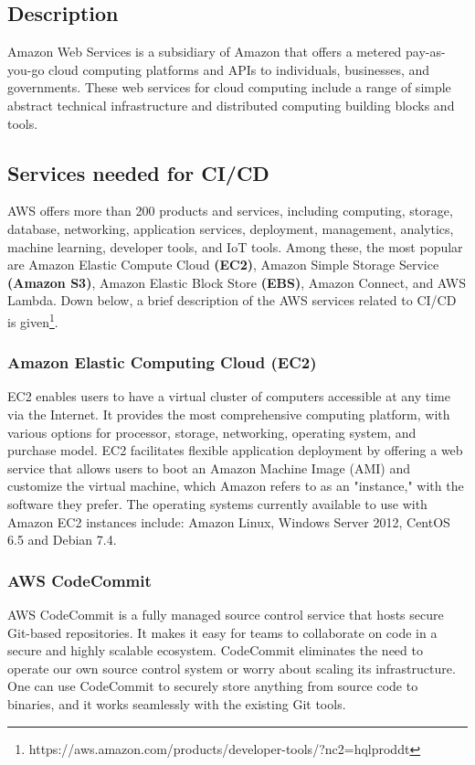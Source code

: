 \subsection{Description}
%
Amazon Web Services is a subsidiary of Amazon that offers a metered pay-as-you-go cloud computing platforms and APIs to individuals, businesses, and governments. These web services for cloud computing include a range of simple abstract technical infrastructure and distributed computing building blocks and tools. 
%
\subsection{Services needed for CI/CD}
%
AWS offers more than 200 products and services, including computing, storage, database, networking, application services, deployment, management, analytics, machine learning, developer tools, and IoT tools. Among these, the most popular are Amazon Elastic Compute Cloud \textbf{(EC2)}, Amazon Simple Storage Service \textbf{(Amazon S3)}, Amazon Elastic Block Store \textbf{(EBS)}, Amazon Connect, and AWS Lambda. Down below, a brief description of the AWS services related to CI/CD is given\footnote{https://aws.amazon.com/products/developer-tools/?nc2=h\textunderscore ql\textunderscore prod\textunderscore dt}. 

\subsubsection{Amazon Elastic Computing Cloud (EC2)}
%
EC2 enables users to have a virtual cluster of computers accessible at any time via the Internet. It provides the most comprehensive computing platform, with  various options for processor, storage, networking, operating system, and purchase model. EC2 facilitates flexible application deployment by offering a web service that allows users to boot an Amazon Machine Image (AMI) and customize the virtual machine, which Amazon refers to as an "instance," with the software they prefer. The operating systems currently available to use with Amazon EC2 instances include: Amazon Linux, Windows Server 2012, CentOS 6.5 and Debian 7.4.
%

\subsubsection{AWS CodeCommit}
%
AWS CodeCommit is a fully managed source control service that hosts secure Git-based repositories. It makes it easy for teams to collaborate on code in a secure and highly scalable ecosystem. CodeCommit eliminates the need to operate our own source control system or worry about scaling its infrastructure. One can use CodeCommit to securely store anything from source code to binaries, and it works seamlessly with the existing Git tools.  
%


